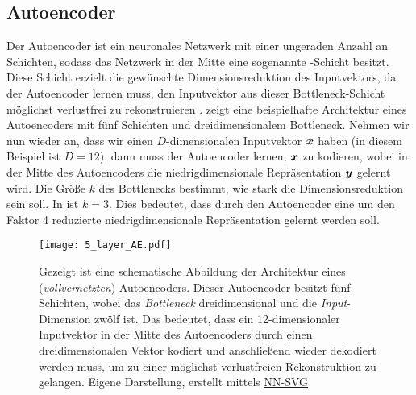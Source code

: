 \subsection{Autoencoder}
\label{ch:MethodenDerDimRed:modern:AE}

Der Autoencoder ist ein neuronales Netzwerk mit einer ungeraden Anzahl an Schichten, sodass das
Netzwerk in der Mitte eine sogenannte -Schicht besitzt. Diese Schicht erzielt die gewünschte
Dimensionsreduktion des Inputvektors, da der Autoencoder lernen muss, den Inputvektor aus dieser
Bottleneck-Schicht möglichst verlustfrei zu rekonstruieren \parencites[502]{Goodfellow.2016}[2]{Bank.2020}.  zeigt eine
beispielhafte Architektur eines Autoencoders mit fünf Schichten und dreidimensionalem Bottleneck.
Nehmen wir nun wieder an, dass wir einen $D$-dimensionalen Inputvektor $\bm{x}$ haben (in diesem
Beispiel ist $D = 12$), dann muss der Autoencoder lernen, $\bm{x}$ zu kodieren, wobei in der
Mitte des Autoencoders die niedrigdimensionale Repräsentation $\bm{y}$ gelernt wird. Die Größe
$k$ des Bottlenecks bestimmt, wie stark die Dimensionsreduktion sein soll. In
 ist $k = 3$. Dies bedeutet, dass durch den Autoencoder eine um den
Faktor 4 reduzierte niedrigdimensionale Repräsentation gelernt werden soll.
\begin{figure}[h]
	\label{fig:5-layer-Autoencoder}
	\begin{center}
		\texttt{[image: 5\_layer\_AE.pdf]}
		\caption[Schematische Abbildung der Architektur eines Autoencoders]{Gezeigt ist eine schematische Abbildung der Architektur eines (\textit{vollvernetzten}) Autoencoders. Dieser Autoencoder besitzt fünf Schichten, wobei das \textit{Bottleneck} dreidimensional und die \textit{Input}-Dimension zwölf ist. Das bedeutet, dass ein 12-dimensionaler Inputvektor in der Mitte des Autoencoders durch einen dreidimensionalen Vektor kodiert und anschließend wieder dekodiert werden muss, um zu einer möglichst verlustfreien Rekonstruktion zu gelangen. Eigene Darstellung, erstellt mittels \href{https://alexlenail.me/NN-SVG/}{NN-SVG}}
	\end{center}
\end{figure}

